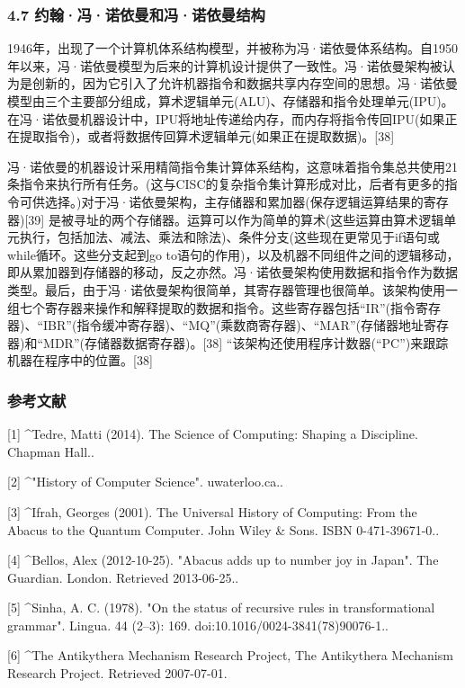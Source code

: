 \subsubsection{4.7 约翰·冯·诺依曼和冯·诺依曼结构}
1946年，出现了一个计算机体系结构模型，并被称为冯·诺依曼体系结构。自1950年以来，冯·诺依曼模型为后来的计算机设计提供了一致性。冯·诺依曼架构被认为是创新的，因为它引入了允许机器指令和数据共享内存空间的思想。冯·诺依曼模型由三个主要部分组成，算术逻辑单元(ALU)、存储器和指令处理单元(IPU)。在冯·诺依曼机器设计中，IPU将地址传递给内存，而内存将指令传回IPU(如果正在提取指令)，或者将数据传回算术逻辑单元(如果正在提取数据)。[38]

冯·诺依曼的机器设计采用精简指令集计算体系结构，这意味着指令集总共使用21条指令来执行所有任务。(这与CISC的复杂指令集计算形成对比，后者有更多的指令可供选择。)对于冯·诺依曼架构，主存储器和累加器(保存逻辑运算结果的寄存器)[39] 是被寻址的两个存储器。运算可以作为简单的算术(这些运算由算术逻辑单元执行，包括加法、减法、乘法和除法)、条件分支(这些现在更常见于if语句或while循环。这些分支起到go to语句的作用)，以及机器不同组件之间的逻辑移动，即从累加器到存储器的移动，反之亦然。冯·诺依曼架构使用数据和指令作为数据类型。最后，由于冯·诺依曼架构很简单，其寄存器管理也很简单。该架构使用一组七个寄存器来操作和解释提取的数据和指令。这些寄存器包括“IR”(指令寄存器)、“IBR”(指令缓冲寄存器)、“MQ”(乘数商寄存器)、“MAR”(存储器地址寄存器)和“MDR”(存储器数据寄存器)。[38] “该架构还使用程序计数器(“PC”)来跟踪机器在程序中的位置。[38]

\subsubsection{参考文献}
[1]
^Tedre, Matti (2014). The Science of Computing: Shaping a Discipline. Chapman Hall..

[2]
^"History of Computer Science". uwaterloo.ca..

[3]
^Ifrah, Georges (2001). The Universal History of Computing: From the Abacus to the Quantum Computer. John Wiley & Sons. ISBN 0-471-39671-0..

[4]
^Bellos, Alex (2012-10-25). "Abacus adds up to number joy in Japan". The Guardian. London. Retrieved 2013-06-25..

[5]
^Sinha, A. C. (1978). "On the status of recursive rules in transformational grammar". Lingua. 44 (2–3): 169. doi:10.1016/0024-3841(78)90076-1..

[6]
^The Antikythera Mechanism Research Project, The Antikythera Mechanism Research Project. Retrieved 2007-07-01.

